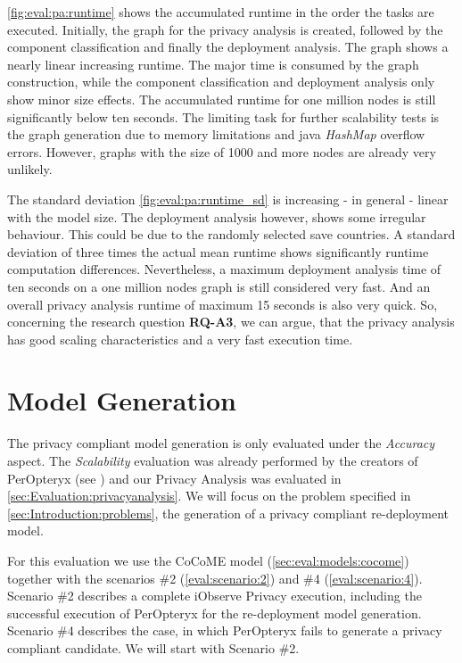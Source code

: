 \autoref{fig:eval:pa:runtime} shows the accumulated runtime in the order the tasks are executed. Initially, the graph for the privacy analysis is created, followed by the component classification and finally the deployment analysis. The graph shows a nearly linear increasing runtime. The major time is consumed by the graph construction, while the component classification and deployment analysis only show minor size effects. The accumulated runtime for one million nodes is still significantly below ten seconds. The limiting task for further scalability tests is the graph generation due to memory limitations and java \textit{HashMap} overflow errors. However, graphs with the size of 1000 and more nodes are already very unlikely.

The standard deviation \autoref{fig:eval:pa:runtime_sd} is increasing - in general - linear with the model size. The deployment analysis however, shows some irregular behaviour. This could be due to the randomly selected save countries. A standard deviation of three times the actual mean runtime shows significantly runtime computation differences. Nevertheless, a maximum deployment analysis time of ten seconds on a one million nodes graph is still considered very fast. And an overall privacy analysis runtime of maximum 15 seconds is also very quick. So, concerning the research question \textbf{RQ-A3}, we can argue, that the privacy analysis has good scaling characteristics and a very fast execution time.


\section{Model Generation}
\label{sec:Evaluation:generation}

The privacy compliant model generation is only evaluated under the \textit{Accuracy} aspect. The \textit{Scalability} evaluation was already performed by the creators of PerOpteryx (see \cite{Koziolek.2014}) and our Privacy Analysis was evaluated in \autoref{sec:Evaluation:privacyanalysis}. We will focus on the problem specified in \autoref{sec:Introduction:problems}, the generation of a privacy compliant re-deployment model.

For this evaluation we use the CoCoME model (\autoref{sec:eval:models:cocome}) together with the scenarios \#2 (\autoref{eval:scenario:2}) and \#4 (\autoref{eval:scenario:4}). Scenario \#2 describes a complete iObserve Privacy execution, including the successful execution of PerOpteryx for the re-deployment model generation. Scenario \#4 describes the case, in which PerOpteryx fails to generate a privacy compliant candidate. We will start with Scenario \#2.

